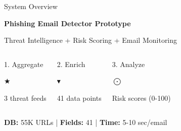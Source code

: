 \documentclass[aspectratio=169]{beamer}
\begin{document}
\begin{frame}{System Overview}
\vspace*{-0.3cm}
\begin{center}
\small{\textbf{Phishing Email Detector Prototype}}

\vspace{0.1cm}
\scriptsize{Threat Intelligence + Risk Scoring + Email Monitoring}
\end{center}

\vspace{0.1cm}
\begin{columns}[T]
\begin{block}{1. Aggregate}
\begin{center}
\small{$\bigstar$}
\end{center}
\scriptsize
3 threat feeds
\end{block}

\begin{block}{2. Enrich}
\begin{center}
\small{$\blacktriangledown$}
\end{center}
\scriptsize
41 data points
\end{block}

\begin{block}{3. Analyze}
\begin{center}
\small{$\bigodot$}
\end{center}
\scriptsize
Risk scores (0-100)
\end{block}
\end{columns}

\vspace{0.1cm}
\scriptsize
\textbf{DB:} 55K URLs | \textbf{Fields:} 41 | \textbf{Time:} 5-10 sec/email
\end{frame}
\end{document}

